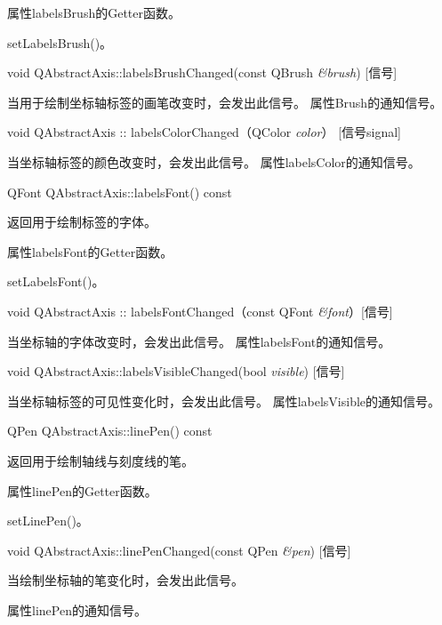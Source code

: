 \begin{notice}
属性labelsBrush的Getter函数。
\end{notice}

\begin{seeAlso}
setLabelsBrush()。
\end{seeAlso}


void QAbstractAxis::labelsBrushChanged(const QBrush \emph{\&brush}) [信号] 

当用于绘制坐标轴标签的画笔改变时，会发出此信号。 属性Brush的通知信号。

void QAbstractAxis :: labelsColorChanged（QColor \emph{color}） [信号signal] 

当坐标轴标签的颜色改变时，会发出此信号。 属性labelsColor的通知信号。

QFont QAbstractAxis::labelsFont() const 

返回用于绘制标签的字体。 

\begin{notice}
属性labelsFont的Getter函数。
\end{notice}

\begin{seeAlso}
setLabelsFont()。
\end{seeAlso}

void QAbstractAxis :: labelsFontChanged（const QFont \emph{\&font}）[信号] 

当坐标轴的字体改变时，会发出此信号。 属性labelsFont的通知信号。

void QAbstractAxis::labelsVisibleChanged(bool \emph{visible}) [信号] 

当坐标轴标签的可见性变化时，会发出此信号。 属性labelsVisible的通知信号。

QPen QAbstractAxis::linePen() const 

返回用于绘制轴线与刻度线的笔。 

\begin{notice}
属性linePen的Getter函数。
\end{notice}

\begin{seeAlso}
setLinePen()。
\end{seeAlso}

void QAbstractAxis::linePenChanged(const QPen \emph{\&pen}) [信号] 

当绘制坐标轴的笔变化时，会发出此信号。 

\begin{notice}
属性linePen的通知信号。
\end{notice}

